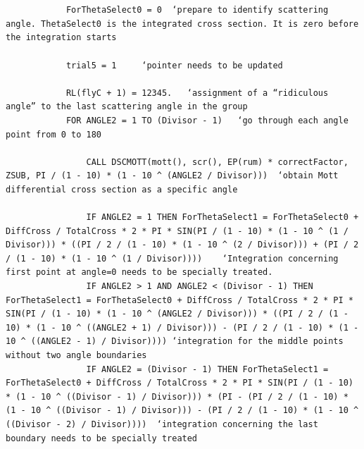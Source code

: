 \documentclass[10pt, reqno]{exam}
\begin{document}
\begin{verbatim}

    
            ForThetaSelect0 = 0  ‘prepare to identify scattering angle. ThetaSelect0 is the integrated cross section. It is zero before the integration starts 
    
            trial5 = 1     ‘pointer needs to be updated
    
            RL(flyC + 1) = 12345.   ‘assignment of a “ridiculous angle” to the last scattering angle in the group
            FOR ANGLE2 = 1 TO (Divisor - 1)   ‘go through each angle point from 0 to 180
    
                CALL DSCMOTT(mott(), scr(), EP(rum) * correctFactor, ZSUB, PI / (1 - 10) * (1 - 10 ^ (ANGLE2 / Divisor)))  ‘obtain Mott differential cross section as a specific angle
    
                IF ANGLE2 = 1 THEN ForThetaSelect1 = ForThetaSelect0 + DiffCross / TotalCross * 2 * PI * SIN(PI / (1 - 10) * (1 - 10 ^ (1 / Divisor))) * ((PI / 2 / (1 - 10) * (1 - 10 ^ (2 / Divisor))) + (PI / 2 / (1 - 10) * (1 - 10 ^ (1 / Divisor))))    ‘Integration concerning first point at angle=0 needs to be specially treated. 
                IF ANGLE2 > 1 AND ANGLE2 < (Divisor - 1) THEN ForThetaSelect1 = ForThetaSelect0 + DiffCross / TotalCross * 2 * PI * SIN(PI / (1 - 10) * (1 - 10 ^ (ANGLE2 / Divisor))) * ((PI / 2 / (1 - 10) * (1 - 10 ^ ((ANGLE2 + 1) / Divisor))) - (PI / 2 / (1 - 10) * (1 - 10 ^ ((ANGLE2 - 1) / Divisor)))) ‘integration for the middle points without two angle boundaries
                IF ANGLE2 = (Divisor - 1) THEN ForThetaSelect1 = ForThetaSelect0 + DiffCross / TotalCross * 2 * PI * SIN(PI / (1 - 10) * (1 - 10 ^ ((Divisor - 1) / Divisor))) * (PI - (PI / 2 / (1 - 10) * (1 - 10 ^ ((Divisor - 1) / Divisor))) - (PI / 2 / (1 - 10) * (1 - 10 ^ ((Divisor - 2) / Divisor))))  ‘integration concerning the last boundary needs to be specially treated
    

\end{verbatim}
\end{document}
